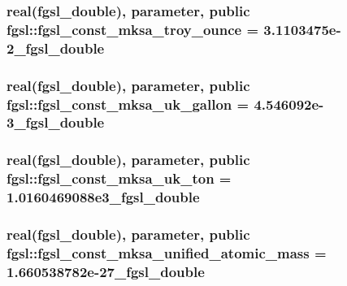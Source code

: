 \subsubsection[{fgsl\+\_\+const\+\_\+mksa\+\_\+troy\+\_\+ounce}]{\setlength{\rightskip}{0pt plus 5cm}real({\bf fgsl\+\_\+double}), parameter, public fgsl\+::fgsl\+\_\+const\+\_\+mksa\+\_\+troy\+\_\+ounce = 3.\+1103475e-\/2\+\_\+fgsl\+\_\+double}\label{namespacefgsl_a7046241db07bad6371b685e812c9d177}
\hypertarget{namespacefgsl_a15754665dbe5dc6a4976466a653b27a3}{}
\subsubsection[{fgsl\+\_\+const\+\_\+mksa\+\_\+uk\+\_\+gallon}]{\setlength{\rightskip}{0pt plus 5cm}real({\bf fgsl\+\_\+double}), parameter, public fgsl\+::fgsl\+\_\+const\+\_\+mksa\+\_\+uk\+\_\+gallon = 4.\+546092e-\/3\+\_\+fgsl\+\_\+double}\label{namespacefgsl_a15754665dbe5dc6a4976466a653b27a3}
\hypertarget{namespacefgsl_a3eea842ca98526b2c06b85da367b7579}{}
\subsubsection[{fgsl\+\_\+const\+\_\+mksa\+\_\+uk\+\_\+ton}]{\setlength{\rightskip}{0pt plus 5cm}real({\bf fgsl\+\_\+double}), parameter, public fgsl\+::fgsl\+\_\+const\+\_\+mksa\+\_\+uk\+\_\+ton = 1.\+0160469088e3\+\_\+fgsl\+\_\+double}\label{namespacefgsl_a3eea842ca98526b2c06b85da367b7579}
\hypertarget{namespacefgsl_a0e18a0c505ad7f70865f8d0351dbec24}{}
\subsubsection[{fgsl\+\_\+const\+\_\+mksa\+\_\+unified\+\_\+atomic\+\_\+mass}]{\setlength{\rightskip}{0pt plus 5cm}real({\bf fgsl\+\_\+double}), parameter, public fgsl\+::fgsl\+\_\+const\+\_\+mksa\+\_\+unified\+\_\+atomic\+\_\+mass = 1.\+660538782e-\/27\+\_\+fgsl\+\_\+double}\label{namespacefgsl_a0e18a0c505ad7f70865f8d0351dbec24}
\hypertarget{namespacefgsl_a9c8e297dc4a0fa63d97e1c130cc5248a}{}
